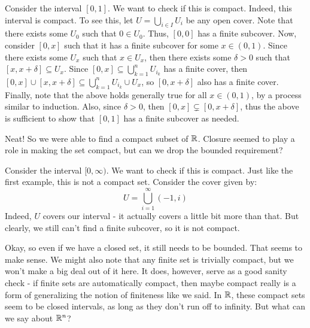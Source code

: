 \documentclass{article}
\begin{document}
\begin{xmp}
    Consider the interval $ [0, 1] $. We want to check if this is compact. \vsp
    Indeed, this interval is compact.
    To see this, let $ U = \bigcup_{i \in I} U_{i} $ be any open cover.
    Note that there exists some $ U_{0} $ such that $ 0 \in U_{0} $.
    Thus, $ [0, 0] $ has a finite subcover. \vsp
    Now, consider $ [0, x] $ such that it has a finite subcover for some $ x \in (0, 1) $.
    Since there exists some $ U_{x} $ such that $ x \in U_{x} $, then there exists some
    $ \delta > 0 $ such that $ [x, x + \delta] \subseteq U_{x} $.
    Since $ [0, x] \subseteq \bigcup_{k=1}^{n} U_{i_{k}} $ has a finite cover, then
    $ [0, x] \cup [x, x + \delta] \subseteq \bigcup_{k=1}^{n} U_{i_{k}} \cup U_{x} $,
    so $ [0, x + \delta] $ also has a finite cover. \vsp
    Finally, note that the above holds generally true for all $ x \in (0, 1) $, by a process
    similar to induction.
    Also, since $ \delta > 0 $, then $ [0, x] \subsetneq [0, x + \delta] $, thus the above
    is sufficient to show that $ [0, 1] $ has a finite subcover as needed.
\end{xmp}

Neat! So we were able to find a compact subset of $ \mathbb{R} $.
Closure seemed to play a role in making the set compact,
but can we drop the bounded requirement?

\begin{xmp}
    Consider the interval $ [0, \infty) $. We want to check if this is compact. \vsp
    Just like the first example, this is not a compact set. Consider the cover given by:
    \begin{equation*}
        U = \bigcup_{i=1}^{\infty} (-1, i)
    \end{equation*}
    Indeed, $ U $ covers our interval - it actually covers a little bit more than that.
    But clearly, we still can't find a finite subcover, so it is not compact.
\end{xmp}

Okay, so even if we have a closed set, it still needs to be bounded.
That seems to make sense. We might also note that any finite set is trivially compact, but
we won't make a big deal out of it here. It does, however, serve as a good sanity check - if
finite sets are automatically compact, then maybe compact really is a
form of generalizing the notion of finiteness like we said.
In $ \mathbb{R} $, these compact sets seem to be closed intervals, as long as they don't run off
to infinity. But what can we say about $ \mathbb{R}^{n} $?
\end{document}
